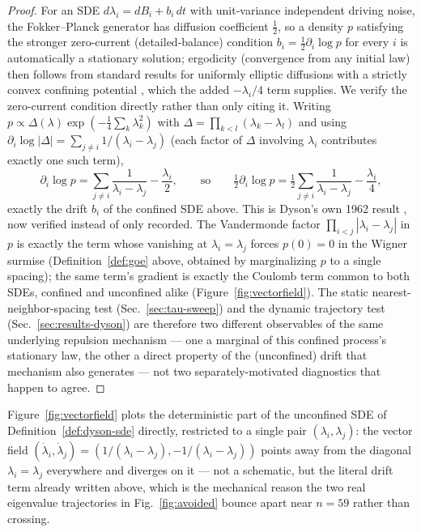 \documentclass[11pt]{article}
\begin{document}
\begin{proof}
For an SDE $d\lambda_i=dB_i+b_i\,dt$ with unit-variance independent
driving noise, the Fokker--Planck generator has diffusion coefficient
$\tfrac12$, so a density $p$ satisfying the stronger zero-current
(detailed-balance) condition $b_i=\tfrac12\partial_i\log p$ for every
$i$ is automatically a stationary solution; ergodicity (convergence
from any initial law) then follows from standard results for
uniformly elliptic diffusions with a strictly convex confining
potential \citep{aguz2010}, which the added $-\lambda_i/4$ term
supplies. We verify the zero-current condition directly rather than
only citing it. Writing $p\propto\Delta(\lambda)\exp(-\tfrac14\sum_k\lambda_k^2)$
with $\Delta=\prod_{k<l}(\lambda_k-\lambda_l)$ and using
$\partial_i\log|\Delta|=\sum_{j\neq i}1/(\lambda_i-\lambda_j)$ (each
factor of $\Delta$ involving $\lambda_i$ contributes exactly one such
term),
\[
\partial_i\log p = \sum_{j\neq i}\frac{1}{\lambda_i-\lambda_j} - \frac{\lambda_i}{2},
\qquad\text{so}\qquad
\tfrac12\partial_i\log p = \tfrac12\sum_{j\neq i}\frac{1}{\lambda_i-\lambda_j} - \frac{\lambda_i}{4},
\]
exactly the drift $b_i$ of the confined SDE above. This is Dyson's own
1962 result \citep{dyson1962}, now verified instead of only recorded.
The Vandermonde factor $\prod_{i<j}|\lambda_i-\lambda_j|$ in $p$ is
exactly the term whose vanishing at $\lambda_i=\lambda_j$ forces
$p(0)=0$ in the Wigner surmise (Definition~\ref{def:goe} above,
obtained by marginalizing $p$ to a single spacing); the same term's
gradient is exactly the Coulomb term common to both SDEs, confined and
unconfined alike (Figure~\ref{fig:vectorfield}). The static
nearest-neighbor-spacing test (Sec.~\ref{sec:tau-sweep}) and the
dynamic trajectory test (Sec.~\ref{sec:results-dyson}) are therefore
two different observables of the same underlying repulsion mechanism
--- one a marginal of this confined process's stationary law, the
other a direct property of the (unconfined) drift that mechanism also
generates --- not two separately-motivated diagnostics that happen to
agree.
\end{proof}

Figure~\ref{fig:vectorfield} plots the deterministic part of the
unconfined SDE of Definition~\ref{def:dyson-sde} directly, restricted
to a single pair $(\lambda_i,\lambda_j)$: the
vector field $(\dot\lambda_i,\dot\lambda_j)=(1/(\lambda_i-\lambda_j),
-1/(\lambda_i-\lambda_j))$ points away from the diagonal
$\lambda_i=\lambda_j$ everywhere and diverges on it --- not a
schematic, but the literal drift term already written above, which is
the mechanical reason the two real eigenvalue trajectories in
Fig.~\ref{fig:avoided} bounce apart near $n=59$ rather than crossing.
\end{document}
